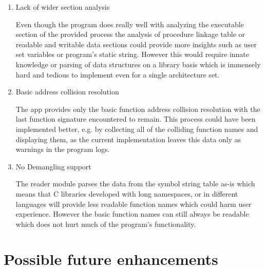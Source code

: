 \begin{enumerate}

    \item {Lack of wider section analysis}
    
    Even though the program does really well with analyzing the executable section of the provided process the analysis of procedure linkage table or readable and writable data sections could provide more insights such as user set variables or program's static string.
    However this would require innate knowledge or parsing of data structures on a library basis which is immensely hard and tedious to implement even for a single architecture set.
    
    \item{Basic address collision resolution}

    The app provides only the basic function address collision resolution with the last function signature encountered to remain.
    This process could have been implemented better, e.g. by collecting all of the colliding function names and displaying them, as the current implementation leaves this data only as warnings in the program logs. 

    \item{No Demangling support}

    The reader module parses the data from the symbol string table as-is which means that C libraries developed with long namespaces, or in different languages will provide less readable function names which could harm user experience.
    However the basic function names can still always be readable which does not hurt much of the program's functionality. 
    
\end{enumerate}

\section{Possible future enhancements}

